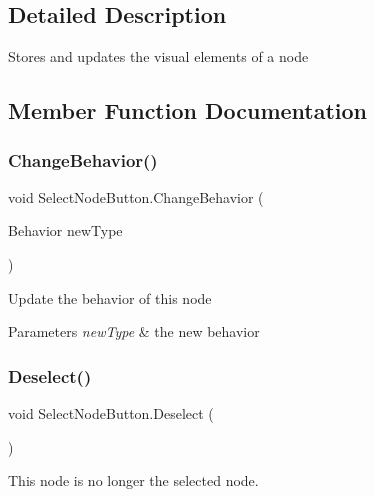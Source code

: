 \subsection{Detailed Description}
Stores and updates the visual elements of a node 



\subsection{Member Function Documentation}
\mbox{\label{class_select_node_button_a23cb12320f235b9caf63e15c27c100ed}} 
\subsubsection{\texorpdfstring{Change\+Behavior()}{ChangeBehavior()}}
{\footnotesize\ttfamily void Select\+Node\+Button.\+Change\+Behavior (\begin{DoxyParamCaption}\item[{Behavior}]{new\+Type }\end{DoxyParamCaption})}



Update the behavior of this node 


\begin{DoxyParams}{Parameters}
{\em new\+Type} & the new behavior \\
\hline
\end{DoxyParams}
\mbox{\label{class_select_node_button_ac0062be5316502f6835aaa2334408bf0}} 
\subsubsection{\texorpdfstring{Deselect()}{Deselect()}}
{\footnotesize\ttfamily void Select\+Node\+Button.\+Deselect (\begin{DoxyParamCaption}{ }\end{DoxyParamCaption})}



This node is no longer the selected node. 

\mbox{\label{class_select_node_button_a818b654206abd20d9cd47ddb2dd0beaf}} 
